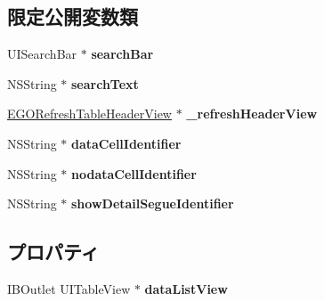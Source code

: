 \subsection*{限定公開変数類}
\begin{DoxyCompactItemize}
\item 
\hypertarget{interface_u_i_table_view_controller_base_a1cbd465a21e67b0dccdc15fd34f403a1}{}U\+I\+Search\+Bar $\ast$ {\bfseries search\+Bar}\label{interface_u_i_table_view_controller_base_a1cbd465a21e67b0dccdc15fd34f403a1}

\item 
\hypertarget{interface_u_i_table_view_controller_base_acb5022da8b583300f15a23f14b376151}{}N\+S\+String $\ast$ {\bfseries search\+Text}\label{interface_u_i_table_view_controller_base_acb5022da8b583300f15a23f14b376151}

\item 
\hypertarget{interface_u_i_table_view_controller_base_a536237db315d55629c8e8a873e434be1}{}\hyperlink{interface_e_g_o_refresh_table_header_view}{E\+G\+O\+Refresh\+Table\+Header\+View} $\ast$ {\bfseries \+\_\+refresh\+Header\+View}\label{interface_u_i_table_view_controller_base_a536237db315d55629c8e8a873e434be1}

\item 
\hypertarget{interface_u_i_table_view_controller_base_a7a3f864ddf5a5c470ff5c5e7387ea158}{}N\+S\+String $\ast$ {\bfseries data\+Cell\+Identifier}\label{interface_u_i_table_view_controller_base_a7a3f864ddf5a5c470ff5c5e7387ea158}

\item 
\hypertarget{interface_u_i_table_view_controller_base_af534590cb6c0ec8bd84a62110609a306}{}N\+S\+String $\ast$ {\bfseries nodata\+Cell\+Identifier}\label{interface_u_i_table_view_controller_base_af534590cb6c0ec8bd84a62110609a306}

\item 
\hypertarget{interface_u_i_table_view_controller_base_a7e56a449ccb9c68c228b5b138154801b}{}N\+S\+String $\ast$ {\bfseries show\+Detail\+Segue\+Identifier}\label{interface_u_i_table_view_controller_base_a7e56a449ccb9c68c228b5b138154801b}

\end{DoxyCompactItemize}
\subsection*{プロパティ}
\begin{DoxyCompactItemize}
\item 
\hypertarget{interface_u_i_table_view_controller_base_a14d406dd394074f16b9dcd0571ea1618}{}I\+B\+Outlet U\+I\+Table\+View $\ast$ {\bfseries data\+List\+View}\label{interface_u_i_table_view_controller_base_a14d406dd394074f16b9dcd0571ea1618}

\end{DoxyCompactItemize}


